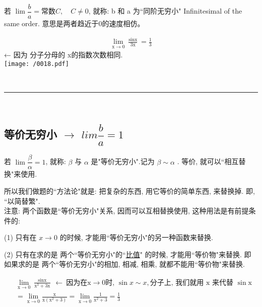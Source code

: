 \documentclass[UTF8]{ctexart}
\begin{document}
若 $\lim \dfrac{b} {a}= \text{常数}C, \quad C \ne 0 $, 就称: b 和 a 为``同阶无穷小" Infinitesimal of the same order. 意思是两者趋近于0的速度相仿。

\begin{myEnvSample}
\begin{align*}  %
	\lim_{\text{x}\rightarrow 0}\frac{\sin\text{x}}{3\text{x}}=\frac{1}{3}  
\end{align*} ← 因为 分子分母的 x的指数次数相同. \\

\texttt{[image: /0018.pdf]}
\end{myEnvSample}


~\\
\hrule
~\\


\subsection{等价无穷小 $\to$ $lim \dfrac{b} {a}=1$} 

若 $\lim \dfrac{\beta} {\alpha} = 1$, 就称: $\beta$ 与 $\alpha$ 是"等价无穷小".记为  $\beta \sim \alpha$ . 等价, 就可以``相互替换"来使用. 

所以我们做题的``方法论"就是: 把复杂的东西, 用它等价的简单东西, 来替换掉. 即, ``以简替繁". \\

注意: 两个函数是``等价无穷小"关系, 因而可以互相替换使用, 这种用法是有前提条件的:

(1) 只有在  $x \to 0$  的时候, 才能用``等价无穷小"的另一种函数来替换.

(2) 只有在求的是 两个``等价无穷小"的``\underline{比值}" 的时候, 才能用``等价物"来替换. 即如果求的是 两个``等价无穷小"的相加, 相减, 相乘, 就都不能用``等价物"来替换. \\

\begin{myEnvSample}
\begin{align*}  %
	&\lim_{\text{x}\rightarrow 0}\frac{\sin\text{x}}{\text{x}^3+3\text{x}}\ \gets \ \text{因为在x}\rightarrow 0\text{时,\ }\sin x \sim x, \text{分子上,\ 我们就用\ x\ 来代替\ }\sin\text{x}\\
	&=\lim_{\text{x}\rightarrow 0}\frac{\text{x}}{\text{x}\left( \text{x}^2+3 \right)}=\lim_{\text{x}\rightarrow 0}\frac{1}{\text{x}^2+3}=\frac{1}{3}
\end{align*}
\end{myEnvSample}
\end{document}
